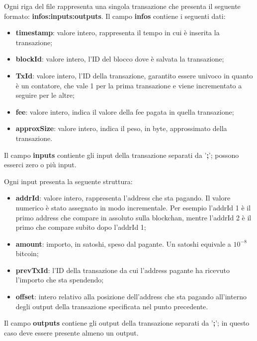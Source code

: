 Ogni riga del file rappresenta una singola transazione che presenta il seguente formato:
\textbf{infos:inputs:outputs}.
Il campo \textbf{infos} contiene i seguenti dati:
\begin{itemize}
    \item \textbf{timestamp}: valore intero, rappresenta il tempo in cui è inserita la transazione;
    \item \textbf{blockId}: valore intero, l'ID del blocco dove è salvata la transazione;
    \item \textbf{TxId}: valore intero, l'ID della transazione, garantito essere univoco in quanto è un contatore, che vale 1 per la prima transazione e viene incrementato a seguire per le altre;
    \item \textbf{fee}: valore intero, indica il valore della fee pagata in quella transazione;
    \item \textbf{approxSize}: valore intero, indica il peso, in byte, approssimato della transazione.
\end{itemize}
Il campo \textbf{inputs} contiente gli input della transazione separati da '\textbf{;}'; possono esserci zero o più input.

Ogni input presenta la seguente struttura:
\begin{itemize}
    \item \textbf{addrId}: valore intero, rappresenta l'address che sta pagando. Il valore numerico è stato assegnato in modo incrementale.
    Per esempio l'addrId 1 è il primo address che compare in assoluto sulla blockchan, mentre l'addrId 2 è il primo che compare subito dopo l'addrId 1;
    \item \textbf{amount}: importo, in satoshi, speso dal pagante. Un satoshi equivale a $10^{-8}$ bitcoin; 
    \item \textbf{prevTxId}: l'ID della transazione da cui l’address pagante ha ricevuto l’importo che sta spendendo;
    \item \textbf{offset}: intero relativo alla posizione dell’address che sta pagando all’interno degli output della transazione specificata nel punto precedente.
\end{itemize}
Il campo \textbf{outputs} contiene gli output della transazione separati da '\textbf{;}'; in questo caso deve essere presente almeno un output.

